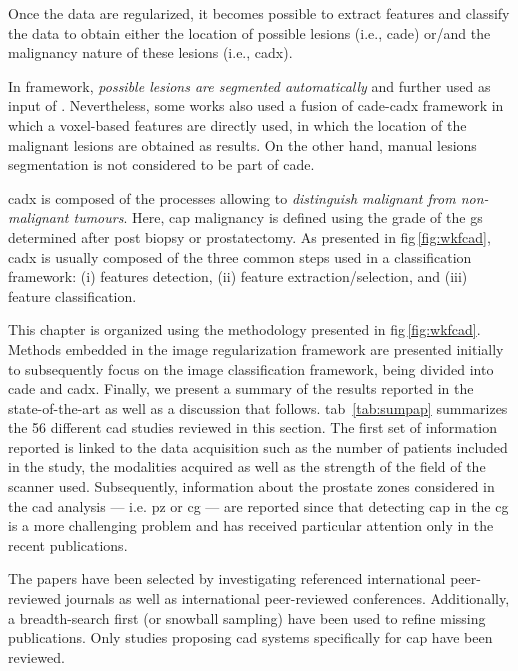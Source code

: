 Once the data are regularized, it becomes possible to extract features and
classify the data to obtain either the location of possible lesions (i.e.,
\ac{cade}) or/and the malignancy nature of these lesions (i.e., \ac{cadx}).

In  framework, \textit{possible lesions are segmented automatically}
and further used as input of .
Nevertheless, some works also used a fusion of \ac{cade}-\ac{cadx} framework in
which a voxel-based features are directly used, in which the location of the
malignant lesions are obtained as results.
On the other hand, manual lesions segmentation is not considered to be part of
\ac{cade}.

\Ac{cadx} is composed of the processes allowing to \textit{distinguish
  malignant from non-malignant tumours}.
Here, \ac{cap} malignancy is defined using the grade of the \ac{gs} determined
after post biopsy or prostatectomy.
As presented in \ac{fig}\,\ref{fig:wkfcad}, \ac{cadx} is usually composed of
the three common steps used in a classification framework: (i) features
detection, (ii) feature extraction/selection, and (iii) feature
classification.

This chapter is organized using the methodology presented in
\acs{fig}\,\ref{fig:wkfcad}.
Methods embedded in the image regularization framework are presented initially
to subsequently focus on the image classification framework, being divided into
\ac{cade} and \ac{cadx}.
Finally, we present a summary of the results reported in the state-of-the-art
as well as a discussion that follows.
\Acl{tab}~\ref{tab:sumpap} summarizes the 56 different \ac{cad} studies
reviewed in this section.
The first set of information reported is linked to the data acquisition such as
the number of patients included in the study, the modalities acquired as well
as the strength of the field of the scanner used.
Subsequently, information about the prostate zones considered in the \ac{cad}
analysis --- i.e. \ac{pz} or \ac{cg} --- are reported since that detecting
\ac{cap} in the \ac{cg} is a more challenging problem and has received
particular attention only in the recent publications.

The papers have been selected by investigating referenced international
peer-reviewed journals as well as international peer-reviewed conferences.
Additionally, a breadth-search first (or snowball sampling) have been used to
refine missing publications.
Only studies proposing \ac{cad} systems specifically for \ac{cap} have been
reviewed.





